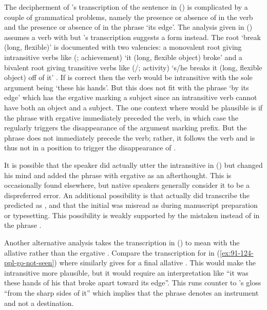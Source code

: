 The decipherment of \citeauthor{swanton:1909}’s transcription of the sentence in (\lastx) is complicated by a couple of grammatical problems, namely the presence or absence of  in the verb  and the presence or absence of  in the phrase  ‘its edge’.
The analysis given in (\lastx) assumes a verb  with  but \citeauthor{swanton:1909}’s transcription  suggests a form  instead.
The root  ‘break (long, flexible)’ is documented with two valencies: a monovalent root  giving intransitive verbs like  (; achievement) ‘it (long, flexible object) broke’ and a bivalent root  giving transitive verbs like  (/;  activity) ‘s/he breaks it (long, flexible object) off of it’ \parencites[f04/136–137]{leer:1973}[780]{leer:1976}.
If  is correct then the verb would be intransitive with the sole argument being  ‘these his hands’.
But this does not fit with the phrase  ‘by its edge’ which has the ergative  marking a subject since an intransitive verb cannot have both an object and a subject.
The one context where  would be plausible is if the phrase with ergative  immediately preceded the verb, in which case the  regularly triggers the disappearance of the  argument marking prefix.
But the phrase  does not immediately precede the verb; rather, it follows the verb and is thus not in a position to trigger the disappearance of .

It is possible that the speaker did actually utter the intransitive  in (\lastx) but changed his mind and added the phrase with ergative  as an afterthought.
This is occasionally found elsewhere, but native speakers generally consider it to be a dispreferred error.
An additional possibility is that \citeauthor{swanton:1909} actually did transcribe the predicted  as , and that the initial  was misread as  during manuscript preparation or typesetting.
This possibility is weakly supported by the mistaken  instead of  in the phrase .

Another alternative analysis takes the transcription  in (\lastx) to mean  with the allative  rather than the ergative .
Compare the transcription  for  in (\ref{ex:91-124-ppl-go-not-seen}) where \citeauthor{swanton:1909} similarly gives  for a final allative .
This would make the intransitive  more plausible, but it would require an interpretation like “it was these hands of his that broke apart toward its edge”.
This runs counter to \citeauthor{swanton:1909}’s gloss “from the sharp sides of it” which implies that the phrase denotes an instrument and not a destination.

